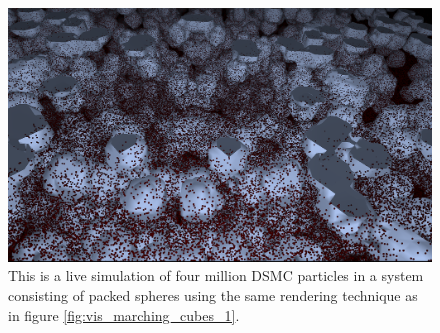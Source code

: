\begin{figure}[htb]
\begin{center}
\includegraphics[width=\textwidth, trim=0cm 0cm 0cm 0cm, clip]{visualization/figures/marching_cubes_spheres_2.png}
\end{center}
\caption{This is a live simulation of four million DSMC particles in a system consisting of packed spheres using the same rendering technique as in figure \ref{fig:vis_marching_cubes_1}.}
\label{fig:vis_marching_cubes_2}
\end{figure}

